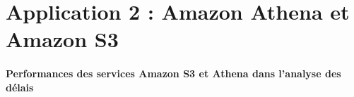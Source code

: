 


 





\section{Application 2 : Amazon Athena et Amazon S3} 

\paragraph{Performances des services Amazon S3 et Athena dans l'analyse des délais }~ \label{aws-perforsm}


